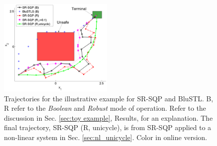 \begin{figure}[t]
\centering
\includegraphics[width=0.49\textwidth]{figures/ToyExUni_scissored.pdf}
\vspace{-20pt}
\caption{{\small Trajectories for the illustrative example for SR-SQP and BluSTL. B, R refer to the \textit{Boolean} and \textit{Robust} mode of operation. Refer to the discussion in Sec. \ref{sec:toy example}, Results, for an explanation. The final trajectory, SR-SQP (R, unicycle), is from SR-SQP applied to a non-linear system in Sec. \ref{sec:nl_unicycle}. Color in online version.}}
\label{fig:toy control}
\vspace{-10pt}
\end{figure}